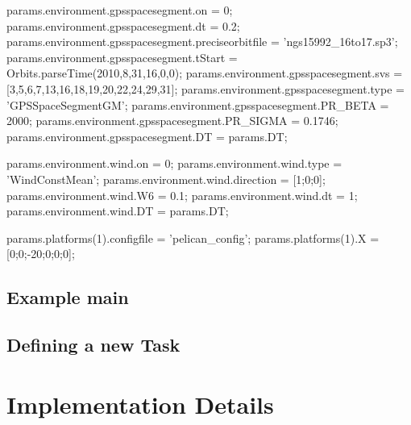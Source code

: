 \documentclass[a4paper,11pt]{report}
\begin{document}
params.environment.gpsspacesegment.on = 0; %
params.environment.gpsspacesegment.dt = 0.2;
params.environment.gpsspacesegment.preciseorbitfile = 'ngs15992_16to17.sp3';
params.environment.gpsspacesegment.tStart = Orbits.parseTime(2010,8,31,16,0,0);
params.environment.gpsspacesegment.svs = [3,5,6,7,13,16,18,19,20,22,24,29,31];
params.environment.gpsspacesegment.type = 'GPSSpaceSegmentGM';
params.environment.gpsspacesegment.PR_BETA = 2000;             %
params.environment.gpsspacesegment.PR_SIGMA = 0.1746;          %
params.environment.gpsspacesegment.DT = params.DT;

params.environment.wind.on = 0;
params.environment.wind.type = 'WindConstMean';
params.environment.wind.direction = [1;0;0]; %
params.environment.wind.W6 = 0.1;  %
params.environment.wind.dt = 1;    %
params.environment.wind.DT = params.DT;

params.platforms(1).configfile = 'pelican_config';
params.platforms(1).X = [0;0;-20;0;0;0];


\section{Example main}




\section{Defining a new Task}


\appendix
\chapter{Implementation Details}
\end{document}
